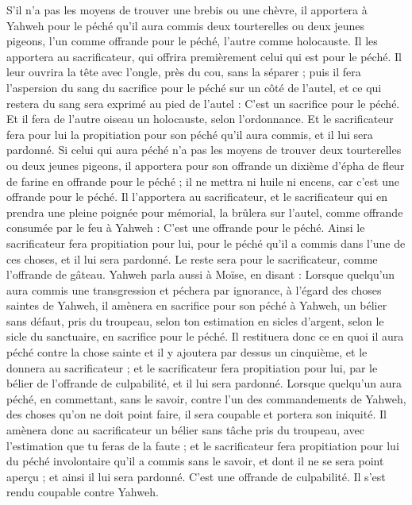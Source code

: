 \begin{multicols}{2}
S’il n’a pas les moyens de trouver une brebis ou une chèvre, il apportera à Yahweh pour le péché qu'il aura commis deux tourterelles ou deux jeunes pigeons, l'un comme offrande pour le péché, l'autre comme holocauste.
Il les apportera au sacrificateur, qui offrira premièrement celui qui est pour le péché. Il leur ouvrira la tête avec l'ongle, près du cou, sans la séparer ;
puis il fera l’aspersion du sang du sacrifice pour le péché sur un côté de l'autel, et ce qui restera du sang sera exprimé au pied de l'autel : C'est un sacrifice pour le péché.
Et il fera de l’autre oiseau un holocauste, selon l'ordonnance. Et le sacrificateur fera pour lui la propitiation pour son péché qu'il aura commis, et il lui sera pardonné.
Si celui qui aura péché n’a pas les moyens de trouver deux tourterelles ou deux jeunes pigeons, il apportera pour son offrande un dixième d'épha de fleur de farine en offrande pour le péché ; il ne mettra ni huile ni encens, car c'est une offrande pour le péché.
Il l'apportera au sacrificateur, et le sacrificateur qui en prendra une pleine poignée pour mémorial, la brûlera sur l'autel, comme offrande consumée par le feu à Yahweh : C'est une offrande pour le péché.
Ainsi le sacrificateur fera propitiation pour lui, pour le péché qu'il a commis dans l'une de ces choses, et il lui sera pardonné. Le reste sera pour le sacrificateur, comme l’offrande de gâteau.
Yahweh parla aussi à Moïse, en disant :
Lorsque quelqu'un aura commis une transgression et péchera par ignorance, à l’égard des choses saintes de Yahweh, il amènera en sacrifice pour son péché à Yahweh, un bélier sans défaut, pris du troupeau, selon ton estimation en sicles d'argent, selon le sicle du sanctuaire, en sacrifice pour le péché.
Il restituera donc ce en quoi il aura péché contre la chose sainte et il y ajoutera par dessus un cinquième, et le donnera au sacrificateur ; et le sacrificateur fera propitiation pour lui, par le bélier de l’offrande de culpabilité, et il lui sera pardonné.
Lorsque quelqu'un aura péché, en commettant, sans le savoir, contre l’un des commandements de Yahweh, des choses qu'on ne doit point faire, il sera coupable et portera son iniquité.
 Il amènera donc au sacrificateur un bélier sans tâche pris du troupeau, avec l’estimation que tu feras de la faute ; et le sacrificateur fera propitiation pour lui du péché involontaire qu’il a commis sans le savoir, et dont il ne se sera point aperçu ; et ainsi il lui sera pardonné.
C’est une offrande de culpabilité. Il s'est rendu coupable contre Yahweh.

\end{multicols}
